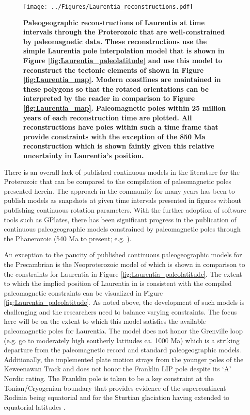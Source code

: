 \documentclass[11pt,letterpaper]{article}
\begin{document}
\begin{figure}
\centering
\texttt{[image: ../Figures/Laurentia\_reconstructions.pdf]}
\caption{\small{\textbf{Paleogeographic reconstructions of Laurentia at time intervals through the Proterozoic that are well-constrained by paleomagnetic data. These reconstructions use the simple Laurentia pole interpolation model that is shown in Figure \ref{fig:Laurentia_paleolatitude} and use this model to reconstruct the tectonic elements of \cite{Whitmeyer2007a} shown in Figure \ref{fig:Laurentia_map}. Modern coastlines are maintained in these polygons so that the rotated orientations can be interpreted by the reader in comparison to Figure \ref{fig:Laurentia_map}. Paleomagnetic poles within 25 million years of each reconstruction time are plotted. All reconstructions have poles within such a time frame that provide constraints with the exception of the 850 Ma reconstruction which is shown faintly given this relative uncertainty in Laurentia's position.}}}
\label{fig:Laurentia_reconstructions}
\end{figure} 

 There is an overall lack of published continuous models in the literature for the Proterozoic that can be compared to the compilation of paleomagnetic poles presented herein. The approach in the community for many years has been to publish models as snapshots at given time intervals presented in figures without publishing continuous rotation parameters. With the further adoption of software tools such as GPlates, there has been significant progress in the publication of continuous paleogeographic models constrained by paleomagnetic poles through the Phanerozoic (540 Ma to present; e.g. \citealp{Torsvik2012a}).
 
 An exception to the paucity of published continuous paleogeographic models for the Precambrian is the Neoproterozoic model of \cite{Merdith2017b} which is shown in comparison to the constraints for Laurentia in Figure \ref{fig:Laurentia_paleolatitude}. The extent to which the implied position of Laurentia in \cite{Merdith2017b} is consistent with the compiled paleomagnetic constraints can be visualized in Figure \ref{fig:Laurentia_paleolatitude}. As noted above, the development of such models is challenging and the researchers need to balance varying constraints. The focus here will be on the extent to which this model satisfies the available paleomagnetic poles for Laurentia. The model does not honor the Grenville loop (e.g. go to moderately high southerly latitudes ca. 1000 Ma) which is a striking departure from the paleomagnetic record and standard paleogeographic models. Additionally, the implemented plate motion strays from the younger poles of the Keweenawan Track and does not honor the Franklin LIP pole \cite{Denyszyn2009b} despite its `A' Nordic rating. The Franklin pole is taken to be a key constraint at the Tonian/Cryogenian boundary that provides evidence of the supercontinent Rodinia being equatorial and for the Sturtian glaciation having extended to equatorial latitudes \citep{Macdonald2010a}.
\end{document}
